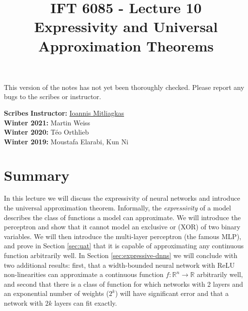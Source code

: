 \documentclass{article}
\title{IFT 6085 - Lecture 10 \\ 
Expressivity and Universal Approximation Theorems}
\date{}
\begin{document}
 

\maketitle

\vspace{-0.5in}
\begin{center}
This version of the notes has not yet been thoroughly checked.
Please report any bugs to the scribes or instructor.
\end{center}
\vspace{0.2in}

\textbf{Scribes}\hfill
\textbf{Instructor:}  {\href{https://mitliagkas.github.io/}{Ioannis Mitliagkas}} \\
\textbf{Winter 2021:} Martin Weiss \\
\textbf{Winter 2020:} Téo Orthlieb \\
\textbf{Winter 2019:} Moustafa Elarabi, Kun Ni \\

\newcommand{\infgc}{\inf_{g \in \mathcal{C}}}
\newcommand{\supgc}{\sup_{g \in \mathcal{C}}}
\newcommand{\Prob}{\mathbb{P}}
\newcommand{\E}{\mathbb{E}}
\newcommand{\reals}{\mathbb{R}}


\section{Summary}

In this lecture we will discuss the expressivity of neural networks and introduce the universal approximation theorem. Informally, the \textit{expressivity} of a model describes the class of functions a model can approximate. We will introduce the perceptron and show that it cannot model an exclusive or (XOR) of two binary variables. We will then introduce the multi-layer perceptron (the famous MLP), and prove in Section \ref{sec:uat} that it is capable of approximating any continuous function arbitrarily well. In Section \ref{sec:expressive-dnns} we will conclude with two additional results: first, that a width-bounded neural network with ReLU non-linearities can approximate a continuous function $f: \mathbb{R}^n \to \mathbb{R}$ arbitrarily well, and second that there is a class of function for which networks with 2 layers and an exponential number of weights ($2^k$) will have significant error and that a network with $2k$ layers can fit exactly.
\end{document}
